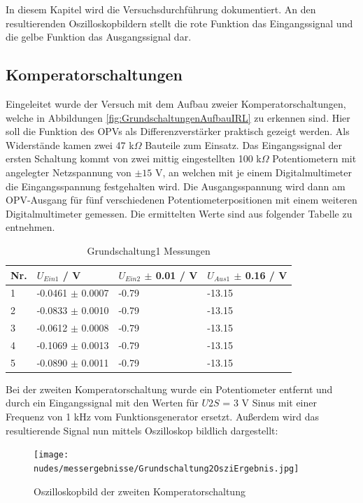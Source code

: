 \documentclass[12pt,a4paper,twoside]{article}
\begin{document}
In diesem Kapitel wird die Versuchsdurchführung dokumentiert. An den resultierenden Oszilloskopbildern stellt die rote Funktion das Eingangssignal und die gelbe Funktion das Ausgangssignal dar.

\subsection{Komperatorschaltungen}

Eingeleitet wurde der Versuch mit dem Aufbau zweier Komperatorschaltungen, welche in Abbildungen \ref{fig:GrundschaltungenAufbauIRL} zu erkennen sind. Hier soll die Funktion des OPVs als Differenzverstärker praktisch gezeigt werden.
Als Widerstände kamen zwei 47 k$\Omega$ Bauteile zum Einsatz. Das Eingangssignal der ersten Schaltung kommt von zwei mittig eingestellten 100 k$\Omega$ Potentiometern mit angelegter Netzspannung von $\pm 15 $ V, an welchen mit je einem Digitalmultimeter die Eingangsspannung festgehalten wird. Die Ausgangsspannung wird dann am OPV-Ausgang für fünf verschiedenen Potentiometerpositionen mit einem weiteren Digitalmultimeter gemessen. Die ermittelten Werte sind aus folgender Tabelle zu entnehmen.

\begin{table}[H]
    \centering
    \caption{Grundschaltung1 Messungen}
    \label{tab:Grundschaltung1Messungen}
    \begin{tabular}{| l | l | l | l |}
        \hline
        Nr. & $U_{Ein1}$ / V & $U_{Ein2}$ $\pm$ 0.01 / V & $U_{Aus1}$ $\pm$ 0.16 / V \\
        \hline
        1 & -0.0461 $\pm$ 0.0007 & -0.79 & -13.15 \\
        2 & -0.0833 $\pm$ 0.0010 & -0.79 & -13.15 \\
        3 & -0.0612 $\pm$ 0.0008 & -0.79 & -13.15 \\
        4 & -0.1069 $\pm$ 0.0013 & -0.79 & -13.15 \\
        5 & -0.0890 $\pm$ 0.0011 & -0.79 & -13.15 \\
        \hline
    \end{tabular}
\end{table}

\noindent
Bei der zweiten Komperatorschaltung wurde ein Potentiometer entfernt und durch ein Eingangssignal mit den Werten für $U{2S}$ = 3 V Sinus mit einer Frequenz von 1 kHz vom Funktionsgenerator ersetzt. Außerdem wird das resultierende Signal nun mittels Oszilloskop bildlich dargestellt:

\begin{figure}[H]
    \centering
    \texttt{[image: nudes/messergebnisse/Grundschaltung2OsziErgebnis.jpg]}
    \caption{Oszilloskopbild der zweiten Komperatorschaltung}
    \label{fig:Grundschaltung2Ergebniss}
\end{figure}
\end{document}
